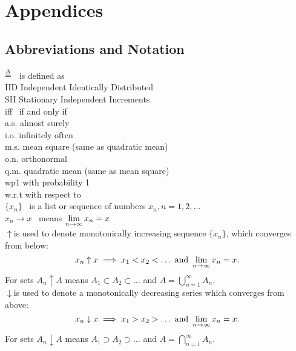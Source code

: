 \section{Appendices}

\subsection{Abbreviations and Notation}
\label{sec:notation}

$\overset{\Delta}{=}$ \quad  ~is defined as \\ 
IID \quad Independent Identically Distributed \\
SII \quad Stationary Independent Increments \\  
{\elevenit iff} \quad ~if and only if \\ 
a.s.  \quad almost surely\\
i.o. \quad infinitely often\\
m.s. \quad mean square (same as quadratic mean)\\
o.n. \quad orthonormal\\ 
q.m. \quad  quadratic mean (same as mean square)\\
wp1 \quad with probability 1\\
w.r.t \quad with respect to \\
$\{x_n\}$\quad ~ is a list or sequence of numbers $x_n, n = 1, 2, \hdots$ \\
$x_n \to x$ ~means $\displaystyle{\lim_{n\rightarrow\infty} x_n = x}$ \\
$\uparrow$\quad is used to denote monotonically increasing sequence $\{x_n\}$, which converges from below:  $$x_n \uparrow x \implies x_1 < x_2 < \hdots \hbox{~and~} \lim_{n\rightarrow\infty} x_n = x.$$
For sets $A_n \uparrow A$ means $A_1 \subset A_2 \subset \hdots $ and $\displaystyle{A=\bigcup\limits_{n=1}^\infty A_n}$.\\

$\downarrow$\quad is used to denote a monotonically decreasing series which converges from above: $$x_n \downarrow x \implies x_1 > x_2 > \hdots \hbox{~and~} \lim_{n\rightarrow\infty} x_n = x.$$
For sets $A_n \downarrow A$ means $A_1 \supset A_2 \supset \hdots $ and $\displaystyle{A=\bigcap\limits_{n=1}^\infty A_n}$.\\

